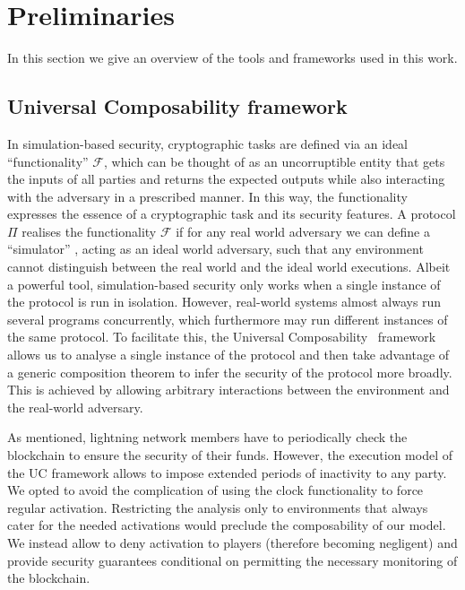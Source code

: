 \section{Preliminaries}
\label{sec:preliminaries}
  In this section we give an overview of the tools and frameworks
  used in this work.

  \subsection{Universal Composability framework}
    In simulation-based security, cryptographic tasks are defined via an ideal
    ``functionality'' $\mathcal{F}$, which can be thought of as an uncorruptible
    entity that gets the inputs of all parties and returns the expected outputs
    while also interacting with the adversary in a prescribed manner. In this
    way, the functionality expresses the essence of a cryptographic task and its
    security features. A protocol $\Pi$ realises the functionality $\mathcal{F}$
    if for any  real world adversary we can define a ``simulator'' \simulator{},
    acting as an ideal world adversary, such that any environment
    \environment{} cannot distinguish between the real world and the
    ideal world executions. Albeit a powerful tool, simulation-based security
    only works when a single instance of the protocol is run in isolation.
    However, real-world systems almost always run several programs concurrently,
    which furthermore may run different instances of the same protocol. To
    facilitate this, the Universal Composability~\cite{uc} framework
    allows us to analyse a single instance of the protocol and then
    take advantage of a generic composition theorem to infer the security of the
    protocol more broadly. This is achieved by allowing arbitrary interactions
    between the environment and the real-world adversary.

    As mentioned, lightning network members have to periodically check
    the blockchain to ensure the security of their funds. However, the execution
    model of the UC framework allows \environment{} to impose extended periods
    of inactivity to any party. We opted to avoid the complication of using the
    clock functionality to force regular activation. Restricting the analysis
    only to environments that always cater for the needed activations would
    preclude the composability of our model. We instead allow \environment{} to
    deny activation to players (therefore becoming negligent) and provide
    security guarantees conditional on \environment{} permitting the necessary
    monitoring of the blockchain.

